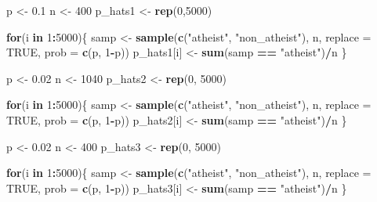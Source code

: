 \documentclass[]{article}
\newenvironment{Shaded}{\begin{snugshade}}{\end{snugshade}}
\newcommand{\KeywordTok}[1]{\textcolor[rgb]{0.13,0.29,0.53}{\textbf{#1}}}
\newcommand{\DataTypeTok}[1]{\textcolor[rgb]{0.13,0.29,0.53}{#1}}
\newcommand{\DecValTok}[1]{\textcolor[rgb]{0.00,0.00,0.81}{#1}}
\newcommand{\FloatTok}[1]{\textcolor[rgb]{0.00,0.00,0.81}{#1}}
\newcommand{\StringTok}[1]{\textcolor[rgb]{0.31,0.60,0.02}{#1}}
\newcommand{\OtherTok}[1]{\textcolor[rgb]{0.56,0.35,0.01}{#1}}
\newcommand{\ControlFlowTok}[1]{\textcolor[rgb]{0.13,0.29,0.53}{\textbf{#1}}}
\newcommand{\OperatorTok}[1]{\textcolor[rgb]{0.81,0.36,0.00}{\textbf{#1}}}
\newcommand{\NormalTok}[1]{#1}
\begin{document}
\begin{Shaded}
\begin{Highlighting}[]
\NormalTok{p <-}\StringTok{ }\FloatTok{0.1}
\NormalTok{n <-}\StringTok{ }\DecValTok{400}
\NormalTok{p_hats1 <-}\StringTok{ }\KeywordTok{rep}\NormalTok{(}\DecValTok{0}\NormalTok{,}\DecValTok{5000}\NormalTok{)}

\ControlFlowTok{for}\NormalTok{(i }\ControlFlowTok{in} \DecValTok{1}\OperatorTok{:}\DecValTok{5000}\NormalTok{)\{}
\NormalTok{  samp <-}\StringTok{ }\KeywordTok{sample}\NormalTok{(}\KeywordTok{c}\NormalTok{(}\StringTok{"atheist"}\NormalTok{, }\StringTok{"non_atheist"}\NormalTok{), n, }\DataTypeTok{replace =} \OtherTok{TRUE}\NormalTok{, }\DataTypeTok{prob =} \KeywordTok{c}\NormalTok{(p, }\DecValTok{1}\OperatorTok{-}\NormalTok{p))}
\NormalTok{  p_hats1[i] <-}\StringTok{ }\KeywordTok{sum}\NormalTok{(samp }\OperatorTok{==}\StringTok{ "atheist"}\NormalTok{)}\OperatorTok{/}\NormalTok{n}
\NormalTok{\}}

\NormalTok{p <-}\StringTok{ }\FloatTok{0.02}
\NormalTok{n <-}\StringTok{ }\DecValTok{1040}
\NormalTok{p_hats2 <-}\StringTok{ }\KeywordTok{rep}\NormalTok{(}\DecValTok{0}\NormalTok{, }\DecValTok{5000}\NormalTok{)}

\ControlFlowTok{for}\NormalTok{(i }\ControlFlowTok{in} \DecValTok{1}\OperatorTok{:}\DecValTok{5000}\NormalTok{)\{}
\NormalTok{  samp <-}\StringTok{ }\KeywordTok{sample}\NormalTok{(}\KeywordTok{c}\NormalTok{(}\StringTok{"atheist"}\NormalTok{, }\StringTok{"non_atheist"}\NormalTok{), n, }\DataTypeTok{replace =} \OtherTok{TRUE}\NormalTok{, }\DataTypeTok{prob =} \KeywordTok{c}\NormalTok{(p, }\DecValTok{1}\OperatorTok{-}\NormalTok{p))}
\NormalTok{  p_hats2[i] <-}\StringTok{ }\KeywordTok{sum}\NormalTok{(samp }\OperatorTok{==}\StringTok{ "atheist"}\NormalTok{)}\OperatorTok{/}\NormalTok{n}
\NormalTok{\}}


\NormalTok{p <-}\StringTok{ }\FloatTok{0.02}
\NormalTok{n <-}\StringTok{ }\DecValTok{400}
\NormalTok{p_hats3 <-}\StringTok{ }\KeywordTok{rep}\NormalTok{(}\DecValTok{0}\NormalTok{, }\DecValTok{5000}\NormalTok{)}

\ControlFlowTok{for}\NormalTok{(i }\ControlFlowTok{in} \DecValTok{1}\OperatorTok{:}\DecValTok{5000}\NormalTok{)\{}
\NormalTok{  samp <-}\StringTok{ }\KeywordTok{sample}\NormalTok{(}\KeywordTok{c}\NormalTok{(}\StringTok{"atheist"}\NormalTok{, }\StringTok{"non_atheist"}\NormalTok{), n, }\DataTypeTok{replace =} \OtherTok{TRUE}\NormalTok{, }\DataTypeTok{prob =} \KeywordTok{c}\NormalTok{(p, }\DecValTok{1}\OperatorTok{-}\NormalTok{p))}
\NormalTok{  p_hats3[i] <-}\StringTok{ }\KeywordTok{sum}\NormalTok{(samp }\OperatorTok{==}\StringTok{ "atheist"}\NormalTok{)}\OperatorTok{/}\NormalTok{n}
\NormalTok{\}}



\end{Highlighting}
\end{Shaded}
\end{document}

